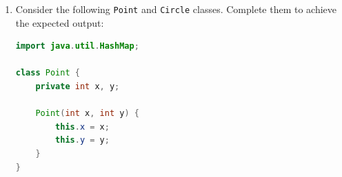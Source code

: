 \documentclass[12pt,a3paper]{article}
\begin{document}
\begin{enumerate}
\begin{tcolorbox}[enhanced,breakable,ansbox,
  colback=cC!4,colframe=cC,boxrule=0.8pt,arc=5pt,
  title={\textbf{Answer --- Book Class: toString, equals, hashCode}},
  fonttitle=\bfseries\color{white},colbacktitle=cC]
\begin{lstlisting}[language=Java]
class Book {
    private String title;
    private String author;
    private int    year;
    private int    edition;

    Book(String title, String author, int year, int edition) {
        this.title   = title;
        this.author  = author;
        this.year    = year;
        this.edition = edition;
    }

    // Two Books are equal if title, author, and year match
    // (edition is ignored for equality)
    @Override
    public boolean equals(Object obj) {
        if (this == obj) return true;
        if (!(obj instanceof Book)) return false;
        Book o = (Book) obj;
        return year == o.year
            && title.equals(o.title)
            && author.equals(o.author);
    }

    // hashCode must be consistent with equals
    @Override
    public int hashCode() {
        return Objects.hash(title, author, year);
    }

    // Format: Book (title, author, year, edition)
    @Override
    public String toString() {
        return "Book (" + title + ", " + author
               + ", " + year + ", " + edition + ")";
    }
}

class BookDemo {
    public static void main(String[] args) {
        Book b1 = new Book("1984", "George Orwell", 1949, 1);
        Book b2 = new Book("1984", "George Orwell", 1949, 2);

        System.out.println(b1);            // Book (1984, George Orwell, 1949, 1)
        System.out.println(b1 == b2);      // false
        System.out.println(b1.equals(b2)); // true

        HashSet<Book> set = new HashSet<>();
        set.add(b1); set.add(b2);
        System.out.println(set.size());    // 1
    }
}
\end{lstlisting}
\textbf{Note:} \texttt{hashCode()} must be overridden alongside
\texttt{equals()} so that equal objects produce the same hash --- a
requirement for correct behaviour in \texttt{HashSet} and
\texttt{HashMap}.
\end{tcolorbox}

\item Consider the following \texttt{Point} and \texttt{Circle} classes. Complete them to achieve the expected output:
\begin{lstlisting}[language=Java]
import java.util.HashMap;

class Point {
    private int x, y;

    Point(int x, int y) {
        this.x = x;
        this.y = y;
    }
}


\end{lstlisting}
\end{enumerate}
\end{document}
